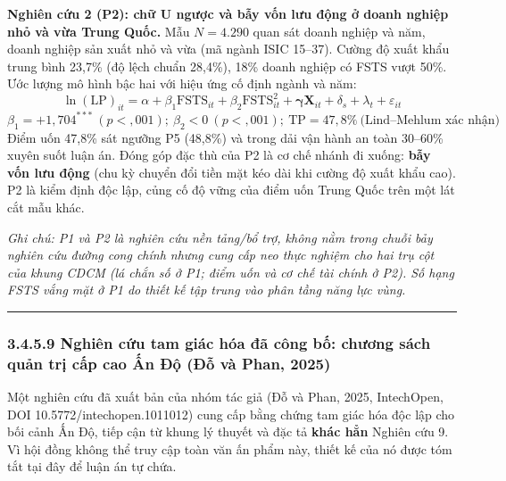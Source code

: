 \documentclass[
  a4paper,
  13pt]{extreport}
\begin{document}
\textbf{Nghiên cứu 2 (P2): chữ U ngược và bẫy vốn lưu động ở doanh
nghiệp nhỏ và vừa Trung Quốc.} Mẫu \(N = 4.290\) quan sát doanh nghiệp
và năm, doanh nghiệp sản xuất nhỏ và vừa (mã ngành ISIC 15--37). Cường
độ xuất khẩu trung bình 23,7\% (độ lệch chuẩn 28,4\%), 18\% doanh nghiệp
có FSTS vượt 50\%. Ước lượng mô hình bậc hai với hiệu ứng cố định ngành
và năm:
\[\ln(\mathrm{LP})_{it} = \alpha + \beta_1 \mathrm{FSTS}_{it} + \beta_2 \mathrm{FSTS}_{it}^{2} + \boldsymbol{\gamma}\mathbf{X}_{it} + \delta_s + \lambda_t + \varepsilon_{it}\]
\[\beta_1 = +1{,}704^{***}\ (p < {,}001);\ \beta_2 < 0\ (p < {,}001);\ \mathrm{TP} = 47{,}8\%\ \text{(Lind–Mehlum xác nhận)}\]
Điểm uốn 47,8\% sát ngưỡng P5 (48,8\%) và trong dải vận hành an toàn
30--60\% xuyên suốt luận án. Đóng góp đặc thù của P2 là cơ chế nhánh đi
xuống: \textbf{bẫy vốn lưu động} (chu kỳ chuyển đổi tiền mặt kéo dài khi
cường độ xuất khẩu cao). P2 là kiểm định độc lập, củng cố độ vững của
điểm uốn Trung Quốc trên một lát cắt mẫu khác.

\emph{Ghi chú: P1 và P2 là nghiên cứu nền tảng/bổ trợ, không nằm trong
chuỗi bảy nghiên cứu đường cong chính nhưng cung cấp neo thực nghiệm cho
hai trụ cột của khung CDCM (lá chắn số ở P1; điểm uốn và cơ chế tài
chính ở P2). Số hạng FSTS vắng mặt ở P1 do thiết kế tập trung vào phân
tầng năng lực vùng.}

\begin{center}\rule{0.5\linewidth}{0.5pt}\end{center}

\hypertarget{nghiuxean-cux1ee9u-tam-giuxe1c-huxf3a-ux111uxe3-cuxf4ng-bux1ed1-chux1b0ux1a1ng-suxe1ch-quux1ea3n-trux1ecb-cux1ea5p-cao-ux1ea5n-ux111ux1ed9-ux111ux1ed7-vuxe0-phan-2025}{%
\subsubsection{3.4.5.9 Nghiên cứu tam giác hóa đã công bố: chương sách
quản trị cấp cao Ấn Độ (Đỗ và Phan,
2025)}\label{nghiuxean-cux1ee9u-tam-giuxe1c-huxf3a-ux111uxe3-cuxf4ng-bux1ed1-chux1b0ux1a1ng-suxe1ch-quux1ea3n-trux1ecb-cux1ea5p-cao-ux1ea5n-ux111ux1ed9-ux111ux1ed7-vuxe0-phan-2025}}

Một nghiên cứu đã xuất bản của nhóm tác giả (Đỗ và Phan, 2025,
IntechOpen, DOI 10.5772/intechopen.1011012) cung cấp bằng chứng tam giác
hóa độc lập cho bối cảnh Ấn Độ, tiếp cận từ khung lý thuyết và đặc tả
\textbf{khác hẳn} Nghiên cứu 9. Vì hội đồng không thể truy cập toàn văn
ấn phẩm này, thiết kế của nó được tóm tắt tại đây để luận án tự chứa.
\end{document}
